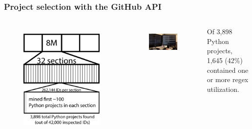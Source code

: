 \begin{frame}
\frametitle{Project selection with the GitHub API}
\begin{columns}[t]
\begin{figure}[ht]
  \includegraphics[scale=0.16]{../nontex/illustrations/32Divided.pdf}
  \label{fig:32Divided}
\end{figure}
\begin{figure}[ht]
  \includegraphics[width=\linewidth]{../nontex/smallScrapersPNG/smallScrapers-112}
    \label{fig:scraper}
\end{figure}
Of 3,898 Python projects, 1,645 (42\%) contained one or more regex utilization.
\end{columns}
\end{frame}

